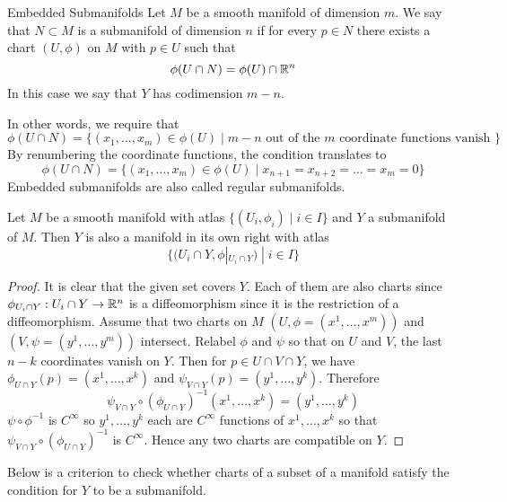 \documentclass[a4paper]{article}
\begin{document}
\begin{defn}{Embedded Submanifolds}{} Let $M$ be a smooth manifold of dimension $m$. We say that $N\subset M$ is a submanifold of dimension $n$ if for every $p\in N$ there exists a chart $(U,\phi)$ on $M$ with $p\in U$ such that $$\phi(U\cap N)=\phi(U)\cap\mathbb{R}^n$$ 
In this case we say that $Y$ has codimension $m-n$. 
\end{defn}

In other words, we require that $$\phi(U\cap N)=\{(x_1,\dots,x_m)\in\phi(U)\;|\;m-n\text{ out of the }m\text{ coordinate functions vanish }\}$$ By renumbering the coordinate functions, the condition translates to $$\phi(U\cap N)=\{(x_1,\dots,x_m)\in\phi(U)\;|\;x_{n+1}=x_{n+2}=\dots=x_m=0\}$$ Embedded submanifolds are also called regular submanifolds. 

\begin{prp}{}{} Let $M$ be a smooth manifold with atlas $\{(U_i,\phi_i)\;|\;i\in I\}$ and $Y$ a submanifold of $M$. Then $Y$ is also a manifold in its own right with atlas $$\{(U_i\cap Y,\phi|_{U_i\cap Y})\;|\;i\in I\}$$\tcbline
\begin{proof}
It is clear that the given set covers $Y$. Each of them are also charts since $\phi_{U_i\cap Y}:U_i\cap Y\to\mathbb{R}^n$ is a diffeomorphism since it is the restriction of a diffeomorphism. Assume that two charts on $M$ $(U,\phi=(x^1,\dots,x^m))$ and $(V,\psi=(y^1,\dots,y^m))$ intersect. Relabel $\phi$ and $\psi$ so that on $U$ and $V$, the last $n-k$ coordinates vanish on $Y$. Then for $p\in U\cap V\cap Y$, we have $\phi_{U\cap Y}(p)=(x^1,\dots,x^k)$ and $\psi_{V\cap Y}(p)=(y^1,\dots,y^k)$. Therefore $$\psi_{V\cap Y}\circ(\phi_{U\cap Y})^{-1}(x^1,\dots,x^k)=(y^1,\dots,y^k)$$ $\psi\circ\phi^{-1}$ is $C^\infty$ so $y^1,\dots,y^k$ each are $C^\infty$ functions of $x^1,\dots,x^k$ so that $\psi_{V\cap Y}\circ(\phi_{U\cap Y})^{-1}$ is $C^\infty$. Hence any two charts are compatible on $Y$. 
\end{proof}
\end{prp}

Below is a criterion to check whether charts of a subset of a manifold satisfy the condition for $Y$ to be a submanifold. 
\end{document}
